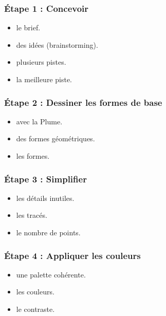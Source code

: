 \subsubsection{Étape 1 : Concevoir}

\begin{itemize}
    \item {} le brief.
    \item {} des idées (brainstorming).
    \item {} plusieurs pistes.
    \item {} la meilleure piste.
\end{itemize}

\subsubsection{Étape 2 : Dessiner les formes de base}

\begin{itemize}
    \item {} avec la Plume.
    \item {} des formes géométriques.
    \item {} les formes.
\end{itemize}

\subsubsection{Étape 3 : Simplifier}

\begin{itemize}
    \item {} les détails inutiles.
    \item {} les tracés.
    \item {} le nombre de points.
\end{itemize}

\subsubsection{Étape 4 : Appliquer les couleurs}

\begin{itemize}
    \item {} une palette cohérente.
    \item {} les couleurs.
    \item {} le contraste.
\end{itemize}

